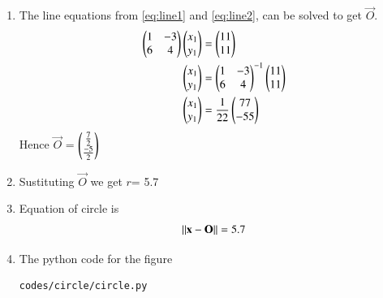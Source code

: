 \begin{enumerate}[label=\thesection.\arabic*.,ref=\thesection.\theenumi]
\item The line equations from \eqref{eq:line1} and \eqref{eq:line2}, can be solved to get $\vec{O}$.
\begin{align}
\begin{pmatrix}1&-3\\6&4\end{pmatrix}\begin{pmatrix}x_1\\y_1\end{pmatrix} &= \begin{pmatrix}11\\11\end{pmatrix} \\
\begin{pmatrix}x_1\\y_1\end{pmatrix} &= \begin{pmatrix}1&-3\\6&4\end{pmatrix}^{-1}\begin{pmatrix}11\\11\end{pmatrix} \\
\begin{pmatrix}x_1\\y_1\end{pmatrix} &= \frac{1}{22}\begin{pmatrix}77\\-55\end{pmatrix}
\end{align}
Hence $\vec{O}$ = $\begin{pmatrix}\frac{7}{2}\\\frac{-5}{2}\end{pmatrix}$

\item Sustituting $\vec{O}$ we get $r$= 5.7
\item Equation of circle is 
\begin{align}
\left\lVert\mathbf{x}- \mathbf{O}\right\rVert= 5.7
\end{align}
\item The python code for the figure
\begin{lstlisting}
codes/circle/circle.py
\end{lstlisting}


\end{enumerate}